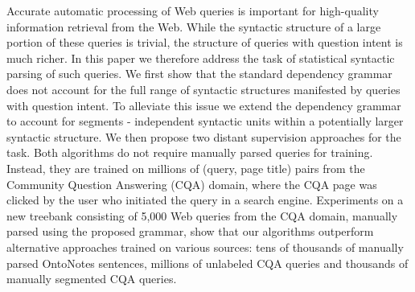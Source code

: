 Accurate automatic processing of Web queries is important for high-quality information retrieval from the Web. While the syntactic structure of a large portion of these queries is trivial, the structure of queries with question intent is much richer. In this paper we therefore address the task of statistical syntactic parsing of such queries. We first show that the standard dependency grammar does not account for the full range of syntactic structures manifested by queries with question intent. To alleviate this issue we extend the dependency grammar to account for segments - independent syntactic units within a potentially larger syntactic structure. We then propose two distant supervision approaches for the task. Both algorithms do not require manually parsed queries for training. Instead, they are trained on millions of (query, page title) pairs from the Community Question Answering (CQA) domain, where the CQA page was clicked by the user who initiated the query in a search engine. Experiments on a new treebank consisting of 5,000 Web queries from the CQA domain, manually parsed using the proposed grammar, show that our algorithms outperform alternative approaches trained on various sources: tens of thousands of manually parsed OntoNotes sentences, millions of unlabeled CQA queries and thousands of manually segmented CQA queries.
